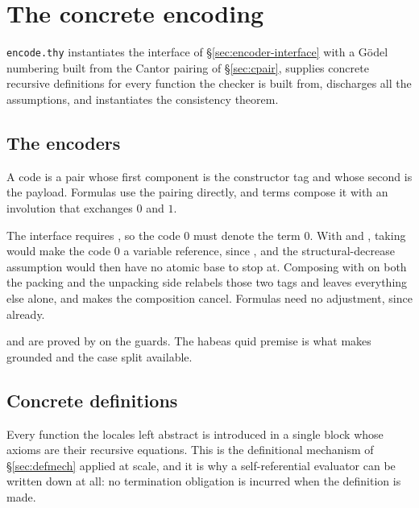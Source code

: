 \section{The concrete encoding}
\label{sec:encode}

\texttt{encode.thy} instantiates the interface of \S\ref{sec:encoder-interface}
with a G\"odel numbering built from the Cantor pairing of \S\ref{sec:cpair},
supplies concrete recursive definitions for every function the checker is built
from, discharges all the assumptions, and instantiates the consistency theorem.

\subsection{The encoders}

A code is a pair whose first component is the constructor tag and whose second
is the payload.  Formulas use the pairing directly, and terms compose it with
an involution that exchanges $0$ and $1$.


\begin{remarkx}
The interface requires , so the code $0$ must denote the
term $0$.  With  and , taking
 would make the code $0$ a variable reference, since
, and the structural-decrease assumption
 would then have no atomic base to stop at.
Composing with  on both the packing and the unpacking side relabels
those two tags and leaves everything else alone, and
 makes the composition cancel.  Formulas need no
adjustment, since  already.
\end{remarkx}


\noindent
{} and  are proved by  on the
guards.  The habeas quid premise  is what makes  grounded
and the case split available.

\subsection{Concrete definitions}

Every function the locales left abstract is introduced in a single
 block whose axioms are their recursive \isa{:=} equations.
This is the definitional mechanism of \S\ref{sec:defmech} applied at scale, and
it is why a self-referential evaluator can be written down at all: no
termination obligation is incurred when the definition is made.

